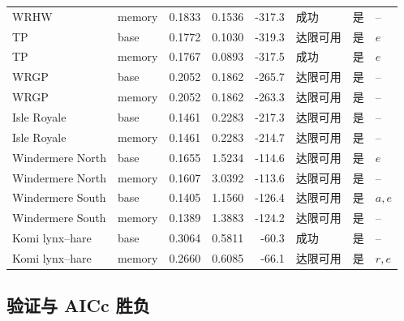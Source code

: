 \documentclass[12pt,a4paper]{ctexart}
\begin{document}
\begin{landscape}
\begin{longtable}{llrrrlll}
 WRHW & memory & 0.1833 & 0.1536 & -317.3 & 成功 & 是 & -- \\
 TP & base & 0.1772 & 0.1030 & -319.3 & 达限可用 & 是 & $e$ \\
 TP & memory & 0.1767 & 0.0893 & -317.5 & 成功 & 是 & $e$ \\
 WRGP & base & 0.2052 & 0.1862 & -265.7 & 达限可用 & 是 & -- \\
 WRGP & memory & 0.2052 & 0.1862 & -263.3 & 达限可用 & 是 & -- \\
 Isle Royale & base & 0.1461 & 0.2283 & -217.3 & 达限可用 & 是 & -- \\
 Isle Royale & memory & 0.1461 & 0.2283 & -214.7 & 达限可用 & 是 & -- \\
 Windermere North & base & 0.1655 & 1.5234 & -114.6 & 达限可用 & 是 & $e$ \\
 Windermere North & memory & 0.1607 & 3.0392 & -113.6 & 达限可用 & 是 & -- \\
 Windermere South & base & 0.1405 & 1.1560 & -126.4 & 达限可用 & 是 & $a,e$ \\
 Windermere South & memory & 0.1389 & 1.3883 & -124.2 & 达限可用 & 是 & -- \\
 Komi lynx--hare & base & 0.3064 & 0.5811 & -60.3 & 成功 & 是 & -- \\
 Komi lynx--hare & memory & 0.2660 & 0.6085 & -66.1 & 达限可用 & 是 & $r,e$ \\
 \bottomrule
\end{longtable}
\end{landscape}

\subsection{验证与 AICc 胜负}
\end{document}
